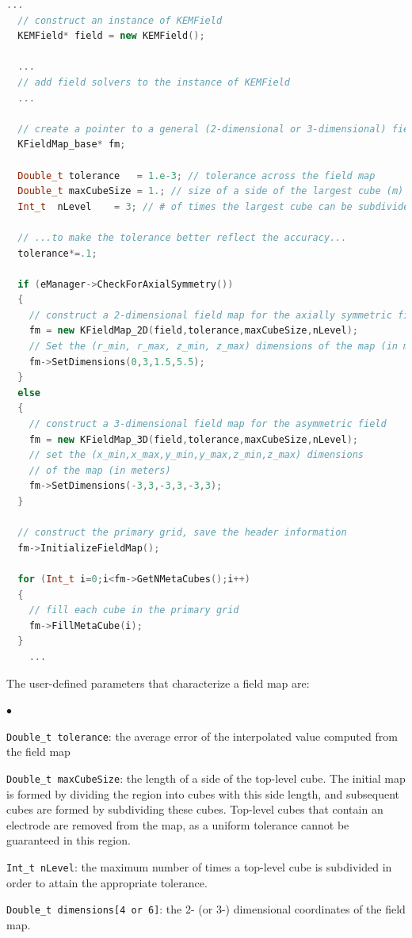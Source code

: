\documentclass[11pt,a4paper,oneside]{article}
\newcommand{\squishlist}{
   \begin{list}{$\bullet$}
    { \setlength{\itemsep}{0pt}      \setlength{\parsep}{3pt}
      \setlength{\topsep}{3pt}       \setlength{\partopsep}{0pt}
      \setlength{\leftmargin}{1.5em} \setlength{\labelwidth}{1em}
      \setlength{\labelsep}{0.5em} } }
\newcommand{\squishend}{
    \end{list}  }
\begin{document}
\begin{lstlisting}[language=C++]
  ...
  // construct an instance of KEMField
  KEMField* field = new KEMField();

  ...
  // add field solvers to the instance of KEMField
  ...

  // create a pointer to a general (2-dimensional or 3-dimensional) field map
  KFieldMap_base* fm;

  Double_t tolerance   = 1.e-3; // tolerance across the field map
  Double_t maxCubeSize = 1.; // size of a side of the largest cube (m)
  Int_t  nLevel    = 3; // # of times the largest cube can be subdivided

  // ...to make the tolerance better reflect the accuracy...
  tolerance*=.1;

  if (eManager->CheckForAxialSymmetry())
  {
    // construct a 2-dimensional field map for the axially symmetric field
    fm = new KFieldMap_2D(field,tolerance,maxCubeSize,nLevel);
    // Set the (r_min, r_max, z_min, z_max) dimensions of the map (in meters)
    fm->SetDimensions(0,3,1.5,5.5);
  }
  else
  {
    // construct a 3-dimensional field map for the asymmetric field
    fm = new KFieldMap_3D(field,tolerance,maxCubeSize,nLevel);
    // set the (x_min,x_max,y_min,y_max,z_min,z_max) dimensions
    // of the map (in meters)
    fm->SetDimensions(-3,3,-3,3,-3,3);
  }
    
  // construct the primary grid, save the header information
  fm->InitializeFieldMap();

  for (Int_t i=0;i<fm->GetNMetaCubes();i++)
  {
    // fill each cube in the primary grid
    fm->FillMetaCube(i);
  }
    ...
\end{lstlisting}
%
The user-defined parameters that characterize a field map are:
%
\squishlist
\item \texttt{Double\_t tolerance}: the average error of the interpolated value computed from the field map
\item \texttt{Double\_t maxCubeSize}:  the length of a side of the top-level cube.  The initial map is formed by dividing the region into cubes with this side length, and subsequent cubes are formed by subdividing these cubes.  Top-level cubes that contain an electrode are removed from the map, as a uniform tolerance cannot be guaranteed in this region.  
\item \texttt{Int\_t nLevel}: the maximum number of times a top-level cube is subdivided in order to attain the appropriate tolerance.
\item \texttt{Double\_t dimensions[4 or 6]}: the 2- (or 3-) dimensional coordinates of the field map.
\squishend
\end{document}
